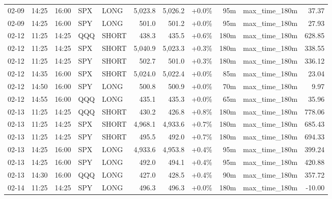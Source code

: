\documentclass[11pt,a4paper,twoside]{article}
\begin{document}
\begin{center}
\begin{longtable}{>{\color{txtmain}}l l l l l r r r r >{\color{txtmain}}l r}
02-09 & 14:25 & 16:00 & SPX & LONG & 5,023.8 & 5,026.2 & \textcolor{wingreen}{+0.0\%} & 95m & max\_time\_180m & \textcolor{wingreen}{37.37} \\
02-09 & 14:25 & 16:00 & SPY & LONG & 501.0 & 501.2 & \textcolor{wingreen}{+0.0\%} & 95m & max\_time\_180m & \textcolor{wingreen}{27.93} \\
02-12 & 11:25 & 14:25 & QQQ & SHORT & 438.3 & 435.5 & \textcolor{wingreen}{+0.6\%} & 180m & max\_time\_180m & \textcolor{wingreen}{628.85} \\
02-12 & 11:25 & 14:25 & SPX & SHORT & 5,040.9 & 5,023.3 & \textcolor{wingreen}{+0.3\%} & 180m & max\_time\_180m & \textcolor{wingreen}{338.55} \\
02-12 & 11:25 & 14:25 & SPY & SHORT & 502.7 & 501.0 & \textcolor{wingreen}{+0.3\%} & 180m & max\_time\_180m & \textcolor{wingreen}{336.12} \\
02-12 & 14:35 & 16:00 & SPX & SHORT & 5,024.0 & 5,022.4 & \textcolor{wingreen}{+0.0\%} & 85m & max\_time\_180m & \textcolor{wingreen}{23.04} \\
02-12 & 14:50 & 16:00 & SPY & LONG & 500.8 & 500.9 & \textcolor{wingreen}{+0.0\%} & 70m & max\_time\_180m & \textcolor{wingreen}{9.97} \\
02-12 & 14:55 & 16:00 & QQQ & LONG & 435.1 & 435.3 & \textcolor{wingreen}{+0.0\%} & 65m & max\_time\_180m & \textcolor{wingreen}{35.96} \\
02-13 & 11:25 & 14:25 & QQQ & SHORT & 430.2 & 426.8 & \textcolor{wingreen}{+0.8\%} & 180m & max\_time\_180m & \textcolor{wingreen}{778.06} \\
02-13 & 11:25 & 14:25 & SPX & SHORT & 4,968.1 & 4,933.6 & \textcolor{wingreen}{+0.7\%} & 180m & max\_time\_180m & \textcolor{wingreen}{685.43} \\
02-13 & 11:25 & 14:25 & SPY & SHORT & 495.5 & 492.0 & \textcolor{wingreen}{+0.7\%} & 180m & max\_time\_180m & \textcolor{wingreen}{694.33} \\
02-13 & 14:25 & 16:00 & SPX & LONG & 4,933.6 & 4,953.8 & \textcolor{wingreen}{+0.4\%} & 95m & max\_time\_180m & \textcolor{wingreen}{399.24} \\
02-13 & 14:25 & 16:00 & SPY & LONG & 492.0 & 494.1 & \textcolor{wingreen}{+0.4\%} & 95m & max\_time\_180m & \textcolor{wingreen}{420.88} \\
02-13 & 14:30 & 16:00 & QQQ & LONG & 427.0 & 428.5 & \textcolor{wingreen}{+0.4\%} & 90m & max\_time\_180m & \textcolor{wingreen}{357.72} \\
02-14 & 11:25 & 14:25 & SPY & LONG & 496.3 & 496.3 & \textcolor{wingreen}{+0.0\%} & 180m & max\_time\_180m & \textcolor{lossred}{-10.00} \\

\end{longtable}
\end{center}
\end{document}
